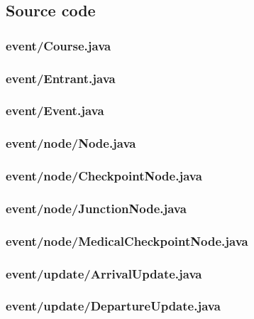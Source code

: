 \documentclass[a4paper, twoside]{article}
\begin{document}
\subsection{Source code}
\subsubsection{event/Course.java}

\newpage
\subsubsection{event/Entrant.java}

\newpage
\subsubsection{event/Event.java}

\newpage
\subsubsection{event/node/Node.java}

\subsubsection{event/node/CheckpointNode.java}

\subsubsection{event/node/JunctionNode.java}

\newpage
\subsubsection{event/node/MedicalCheckpointNode.java}

\subsubsection{event/update/ArrivalUpdate.java}

\newpage
\subsubsection{event/update/DepartureUpdate.java}

\newpage
\end{document}
